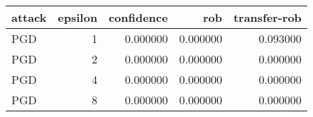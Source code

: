 \begin{tabular}{lrrrr}
\toprule
attack & epsilon & confidence & rob & transfer-rob \\
\midrule
PGD & 1 & 0.000000 & 0.000000 & 0.093000 \\
PGD & 2 & 0.000000 & 0.000000 & 0.000000 \\
PGD & 4 & 0.000000 & 0.000000 & 0.000000 \\
PGD & 8 & 0.000000 & 0.000000 & 0.000000 \\
\bottomrule
\end{tabular}
